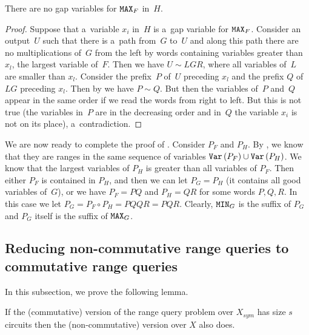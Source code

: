 \documentclass{toc}
\begin{document}
\begin{claim}\label{cl: f is good}
    There are no gap variables for $\texttt{MAX}_F$ in~$H$.
\end{claim}

\begin{proof}
    Suppose that a~variable $x_i$ in~$H$ is a~gap variable for $\texttt{MAX}_F$. Consider an output~$U$ such that there is a~path from~$G$ to~$U$ and along this path there are no multiplications of~$G$ from the left by words containing variables greater than $x_l$, the largest variable of~$F$. Then we have $U \sim LGR$, where all variables of~$L$ are smaller than $x_l$. Consider the prefix~$P$ of~$U$ preceding $x_l$ and the prefix $Q$ of $LG$ preceding $x_l$.
    Then by  we have $P \sim Q$. But then the variables of~$P$ and~$Q$ appear in the same order if we read the words from right to left. But this is not true (the variables in~$P$ are in the decreasing order and in~$Q$ the variable $x_i$ is not on its place), a~contradiction.
\end{proof}

We are now ready to complete the proof of .
Consider $P_F$ and $P_H$. By  , we know that they are ranges in the same sequence of variables $\texttt{Var}\,(P_F)\cup \texttt{Var}\,(P_H)$. We know that the largest variables of $P_H$ is greater than all variables of $P_F$. Then either $P_F$ is contained in $P_H$, and then we can let $P_G=P_H$ (it contains all good variables of~$G$), or we have $P_F =PQ$ and $P_H=QR$ for some words $P, Q, R$. In this case we let $P_G = P_F \circ P_H = PQQR=PQR$. Clearly, $\texttt{MIN}_G$ is the suffix of $P_G$ and $P_G$ itself is the suffix of $\texttt{MAX}_G$.



\subsection{Reducing non-commutative range queries to commutative range queries} \label{sec:non-commutative_to_commutative}

In this subsection, we prove the following lemma.

\begin{lemma} \label{lem:intervals}
    If the (commutative) version of the
    range query
    problem over $X_{sym}$ has
    size $s$ circuits then the (non-commutative) version over $X$ also does.
\end{lemma}
\end{document}
